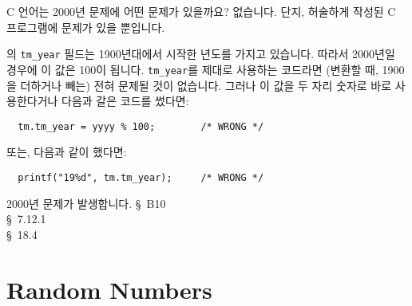 \begin{faq}
	C 언어는 2000년 문제에 어떤 문제가 있을까요?
\A
	없습니다.  단지, 허술하게 작성된 C 프로그램에 문제가 있을 뿐입니다.
	
	의 \verb+tm_year+ 필드는 1900년대에서 시작한 년도를
	가지고 있습니다.  따라서 2000년일 경우에 이 값은 100이 됩니다.
	\verb+tm_year+를 제대로 사용하는 코드라면 (변환할 때, 1900을 더하거나
	빼는) 전혀 문제될 것이 없습니다.  그러나 이 값을 두 자리 숫자로
	바로 사용한다거나 다음과 갈은 코드를 썼다면:
\begin{verbatim}
  tm.tm_year = yyyy % 100;        /* WRONG */
\end{verbatim}
	\noindent 또는, 다음과 같이 했다면:
\begin{verbatim}
  printf("19%d", tm.tm_year);     /* WRONG */
\end{verbatim}
	\noindent 2000년 문제가 발생합니다.  
\R
	\cite{kr2} \S\ B10  \\
	\cite{c89} \S\ 7.12.1 \\
	\cite{hs} \S\ 18.4 
\end{faq}

\section{Random Numbers}

